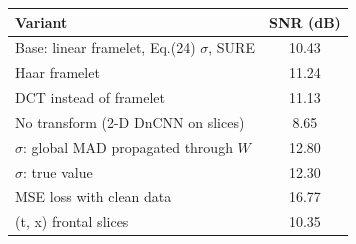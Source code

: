 \begin{tabular}{lc}
\hline
Variant & SNR (dB) \\
\hline
Base: linear framelet, Eq.(24) $\sigma$, SURE & 10.43 \\
Haar framelet & 11.24 \\
DCT instead of framelet & 11.13 \\
No transform (2-D DnCNN on slices) & 8.65 \\
$\sigma$: global MAD propagated through $W$ & 12.80 \\
$\sigma$: true value & 12.30 \\
MSE loss with clean data & 16.77 \\
(t, x) frontal slices & 10.35 \\
\hline
\end{tabular}
